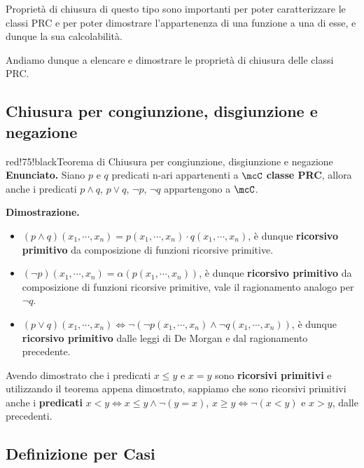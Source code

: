 Proprietà di chiusura di questo tipo sono importanti per poter caratterizzare le classi PRC e per poter dimostrare l'appartenenza di una funzione a una di esse, e dunque la sua calcolabilità.

Andiamo dunque a elencare e dimostrare le proprietà di chiusura delle classi PRC. %

\subsection{Chiusura per congiunzione, disgiunzione e negazione}

\begin{halfframedbox}{red!75!black}{Teorema di Chiusura per congiunzione\(\text{,}\) disgiunzione e negazione}\label{Chiusure per congiunzione, disgiunzione e negazione Teorema}
  \textbf{Enunciato.} Siano \(p\) e \(q\) predicati n-ari appartenenti a \(\mcC\) \textbf{classe PRC}, allora anche i predicati \(p \land q\), \(p \lor q\), \(\neg p\), \(\neg q\) appartengono a \(\mcC\).

  \begin{center}
    \textcolor{red!75!black}{\hdashrule[0.5ex]{18cm}{1pt}{3mm 3pt 1mm 2pt}}
  \end{center}

  \textbf{Dimostrazione. }
  \begin{itemize}
    \item \((p \land q)(x_1,\cdots,x_n) = p(x_1,\cdots,x_n) \cdot q(x_1,\cdots,x_n)\), è dunque \textbf{ricorsivo primitivo} da composizione di funzioni ricorsive primitive.
    \item \((\neg p)(x_1,\cdots,x_n)=\alpha(p(x_1,\cdots,x_n))\), è dunque \textbf{ricorsivo primitivo} da composizione di funzioni ricorsive primitive, vale il ragionamento analogo per \(\neg q\).
    \item \((p \lor q)(x_1,\cdots,x_n) \iff \neg(\neg p(x_1,\cdots,x_n) \land \neg q(x_1,\cdots,x_n))\), è dunque \textbf{ricorsivo primitivo} dalle leggi di De Morgan e dal ragionamento precedente.
   \end{itemize}
\end{halfframedbox}

Avendo dimostrato che i predicati \(x \leq y\) e \(x=y\) sono \textbf{ricorsivi primitivi} e utilizzando il teorema appena dimostrato, sappiamo che sono ricorsivi primitivi anche i \textbf{predicati} \(x<y\iff x\leq y \land \neg (y= x)\), \(x\geq y\iff\neg(x<y)\) e \(x>y\), dalle precedenti.

\subsection{Definizione per Casi}

